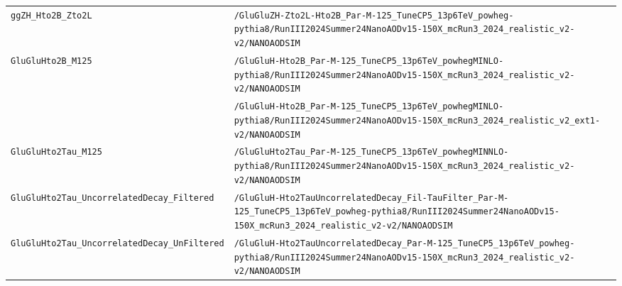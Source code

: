 \begin{longtable}{@{}>{\RaggedRight\arraybackslash}p{} >{\RaggedRight\arraybackslash}p{}@{}}
\addlinespace[2pt]
\texttt{ggZH\_\allowbreak{}Hto2B\_\allowbreak{}Zto2L} & \texttt{/\allowbreak{}GluGluZH-\allowbreak{}Zto2L-\allowbreak{}Hto2B\_\allowbreak{}Par-\allowbreak{}M-\allowbreak{}125\_\allowbreak{}TuneCP5\_\allowbreak{}13p6TeV\_\allowbreak{}powheg-\allowbreak{}pythia8/\allowbreak{}RunIII2024Summer24NanoAODv15-\allowbreak{}150X\_\allowbreak{}mcRun3\_\allowbreak{}2024\_\allowbreak{}realistic\_\allowbreak{}v2-\allowbreak{}v2/\allowbreak{}NANOAODSIM} \\
\addlinespace[2pt]
\texttt{GluGluHto2B\_\allowbreak{}M125} & \texttt{/\allowbreak{}GluGluH-\allowbreak{}Hto2B\_\allowbreak{}Par-\allowbreak{}M-\allowbreak{}125\_\allowbreak{}TuneCP5\_\allowbreak{}13p6TeV\_\allowbreak{}powhegMINLO-\allowbreak{}pythia8/\allowbreak{}RunIII2024Summer24NanoAODv15-\allowbreak{}150X\_\allowbreak{}mcRun3\_\allowbreak{}2024\_\allowbreak{}realistic\_\allowbreak{}v2-\allowbreak{}v2/\allowbreak{}NANOAODSIM} \\
 & \texttt{/\allowbreak{}GluGluH-\allowbreak{}Hto2B\_\allowbreak{}Par-\allowbreak{}M-\allowbreak{}125\_\allowbreak{}TuneCP5\_\allowbreak{}13p6TeV\_\allowbreak{}powhegMINLO-\allowbreak{}pythia8/\allowbreak{}RunIII2024Summer24NanoAODv15-\allowbreak{}150X\_\allowbreak{}mcRun3\_\allowbreak{}2024\_\allowbreak{}realistic\_\allowbreak{}v2\_\allowbreak{}ext1-\allowbreak{}v2/\allowbreak{}NANOAODSIM} \\
\addlinespace[2pt]
\texttt{GluGluHto2Tau\_\allowbreak{}M125} & \texttt{/\allowbreak{}GluGluHto2Tau\_\allowbreak{}Par-\allowbreak{}M-\allowbreak{}125\_\allowbreak{}TuneCP5\_\allowbreak{}13p6TeV\_\allowbreak{}powhegMINNLO-\allowbreak{}pythia8/\allowbreak{}RunIII2024Summer24NanoAODv15-\allowbreak{}150X\_\allowbreak{}mcRun3\_\allowbreak{}2024\_\allowbreak{}realistic\_\allowbreak{}v2-\allowbreak{}v2/\allowbreak{}NANOAODSIM} \\
\addlinespace[2pt]
\texttt{GluGluHto2Tau\_\allowbreak{}UncorrelatedDecay\_\allowbreak{}Filtered} & \texttt{/\allowbreak{}GluGluH-\allowbreak{}Hto2TauUncorrelatedDecay\_\allowbreak{}Fil-\allowbreak{}TauFilter\_\allowbreak{}Par-\allowbreak{}M-\allowbreak{}125\_\allowbreak{}TuneCP5\_\allowbreak{}13p6TeV\_\allowbreak{}powheg-\allowbreak{}pythia8/\allowbreak{}RunIII2024Summer24NanoAODv15-\allowbreak{}150X\_\allowbreak{}mcRun3\_\allowbreak{}2024\_\allowbreak{}realistic\_\allowbreak{}v2-\allowbreak{}v2/\allowbreak{}NANOAODSIM} \\
\addlinespace[2pt]
\texttt{GluGluHto2Tau\_\allowbreak{}UncorrelatedDecay\_\allowbreak{}UnFiltered} & \texttt{/\allowbreak{}GluGluH-\allowbreak{}Hto2TauUncorrelatedDecay\_\allowbreak{}Par-\allowbreak{}M-\allowbreak{}125\_\allowbreak{}TuneCP5\_\allowbreak{}13p6TeV\_\allowbreak{}powheg-\allowbreak{}pythia8/\allowbreak{}RunIII2024Summer24NanoAODv15-\allowbreak{}150X\_\allowbreak{}mcRun3\_\allowbreak{}2024\_\allowbreak{}realistic\_\allowbreak{}v2-\allowbreak{}v2/\allowbreak{}NANOAODSIM} \\

\end{longtable}
